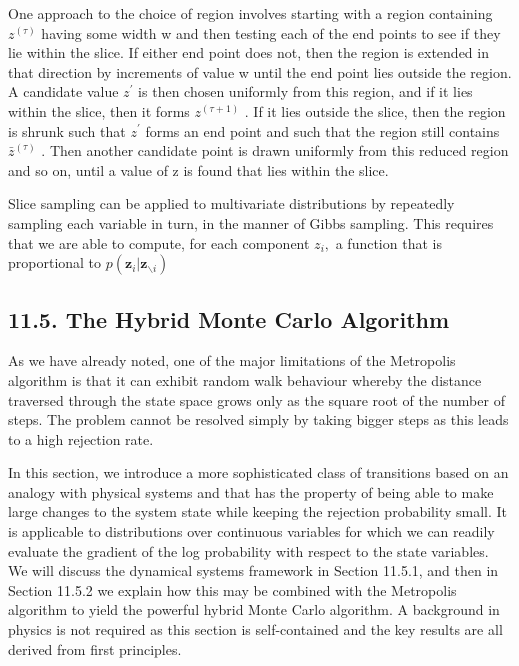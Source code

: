 \documentclass[
  10
]{article}
\begin{document}
One approach to the choice of region involves starting with a region
containing \(z ^ { ( \tau ) }\) having some width w and then testing
each of the end points to see if they lie within the slice. If either
end point does not, then the region is extended in that direction by
increments of value w until the end point lies outside the region. A
candidate value \(z ^ { \prime }\) is then chosen uniformly from this
region, and if it lies within the slice, then it forms
\(z ^ { ( \tau + 1 ) }\) . If it lies outside the slice, then the region
is shrunk such that \(z ^ { \prime }\) forms an end point and such that
the region still contains \(\bar { z } ^ { ( \tau ) }\) . Then another
candidate point is drawn uniformly from this reduced region and so on,
until a value of z is found that lies within the slice.

Slice sampling can be applied to multivariate distributions by
repeatedly sampling each variable in turn, in the manner of Gibbs
sampling. This requires that we are able to compute, for each component
\(z _ { i } ,\) a function that is proportional to
\(p ( \boldsymbol { z } _ { i } | \mathbf { z } _ { \backslash i } )\)

\subsection{11.5. The Hybrid Monte Carlo
Algorithm}\label{the-hybrid-monte-carlo-algorithm}

As we have already noted, one of the major limitations of the Metropolis
algorithm is that it can exhibit random walk behaviour whereby the
distance traversed through the state space grows only as the square root
of the number of steps. The problem cannot be resolved simply by taking
bigger steps as this leads to a high rejection rate.

In this section, we introduce a more sophisticated class of transitions
based on an analogy with physical systems and that has the property of
being able to make large changes to the system state while keeping the
rejection probability small. It is applicable to distributions over
continuous variables for which we can readily evaluate the gradient of
the log probability with respect to the state variables. We will discuss
the dynamical systems framework in Section 11.5.1, and then in Section
11.5.2 we explain how this may be combined with the Metropolis algorithm
to yield the powerful hybrid Monte Carlo algorithm. A background in
physics is not required as this section is self-contained and the key
results are all derived from first principles.
\end{document}
